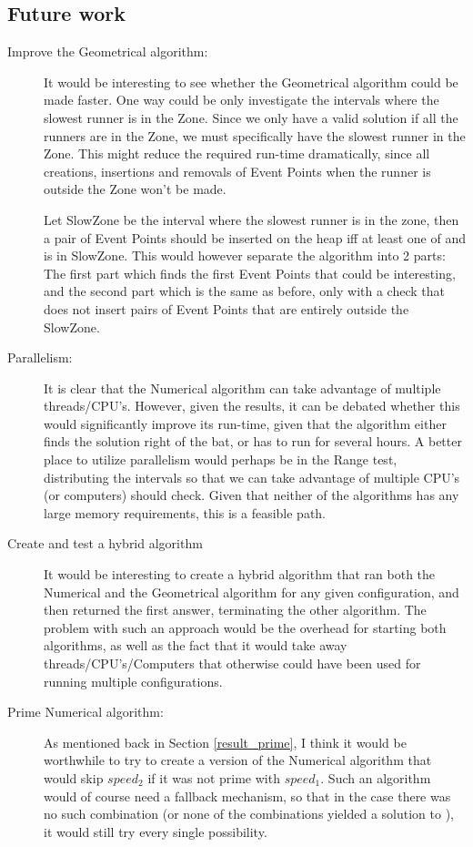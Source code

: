 \subsection{Future work}
\begin{description}
\item[Improve the Geometrical algorithm:] It would be interesting to see whether the Geometrical algorithm could be made faster. One way could be only investigate the intervals where the slowest runner is in the Zone. Since we only have a valid solution if all the runners are in the Zone, we must specifically have the slowest runner in the Zone. This might reduce the required run-time dramatically, since all creations, insertions and removals of Event Points when the runner is outside the Zone won't be made. 

Let SlowZone be the interval where the slowest runner is in the zone, then a pair of Event Points should be inserted on the heap iff at least one of \comStart and \comFin is in SlowZone. This would however separate the algorithm into 2 parts: The first part which finds the first Event Points that could be interesting, and the second part which is the same as before, only with a check that does not insert pairs of Event Points that are entirely outside the SlowZone.

\item[Parallelism:] It is clear that the Numerical algorithm can take advantage of multiple threads/CPU's. However, given the results, it can be debated whether this would significantly improve its run-time, given that the algorithm either finds the solution right of the bat, or has to run for several hours. A better place to utilize parallelism would perhaps be in the Range test, distributing the intervals so that we can take advantage of multiple CPU's (or computers) should check. Given that neither of the algorithms has any large memory requirements, this is a feasible path.

\item[Create and test a hybrid algorithm] It would be interesting to create a hybrid algorithm that ran both the Numerical and the Geometrical algorithm for any given configuration, and then returned the first answer, terminating the other algorithm. The problem with such an approach would be the overhead for starting both algorithms, as well as the fact that it would take away threads/CPU's/Computers that otherwise could have been used for running multiple configurations. 

\item[Prime Numerical algorithm:] As mentioned back in Section \ref{result_prime}, I think it would be worthwhile to try to create a version of the Numerical algorithm that would skip $speed_2$ if it was not prime with $speed_1$. Such an algorithm would of course need a fallback mechanism, so that in the case there was no such combination (or none of the combinations yielded a solution to ), it would still try every single possibility.


\end{description}
